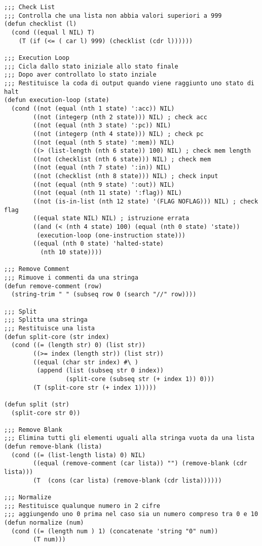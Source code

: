 \documentclass[a4paper,12pt, oneside]{book}
\begin{document}
\begin{verbatim}
;;; Check List
;;; Controlla che una lista non abbia valori superiori a 999
(defun checklist (l)
  (cond ((equal l NIL) T)
    (T (if (<= ( car l) 999) (checklist (cdr l))))))

;;; Execution Loop
;;; Cicla dallo stato iniziale allo stato finale 
;;; Dopo aver controllato lo stato inziale
;;; Restituisce la coda di output quando viene raggiunto uno stato di halt
(defun execution-loop (state)
  (cond ((not (equal (nth 1 state) ':acc)) NIL)
        ((not (integerp (nth 2 state))) NIL) ; check acc
        ((not (equal (nth 3 state) ':pc)) NIL)
        ((not (integerp (nth 4 state))) NIL) ; check pc
        ((not (equal (nth 5 state) ':mem)) NIL)
        ((> (list-length (nth 6 state)) 100) NIL) ; check mem length
        ((not (checklist (nth 6 state))) NIL) ; check mem
        ((not (equal (nth 7 state) ':in)) NIL)
        ((not (checklist (nth 8 state))) NIL) ; check input
        ((not (equal (nth 9 state) ':out)) NIL)
        ((not (equal (nth 11 state) ':flag)) NIL)
        ((not (is-in-list (nth 12 state) '(FLAG NOFLAG))) NIL) ; check flag
        ((equal state NIL) NIL) ; istruzione errata
        ((and (< (nth 4 state) 100) (equal (nth 0 state) 'state))
         (execution-loop (one-instruction state)))
        ((equal (nth 0 state) 'halted-state) 
          (nth 10 state))))

;;; Remove Comment
;;; Rimuove i commenti da una stringa 
(defun remove-comment (row)
  (string-trim " " (subseq row 0 (search "//" row))))

;;; Split
;;; Splitta una stringa
;;; Restituisce una lista 
(defun split-core (str index)
  (cond ((= (length str) 0) (list str))
        ((>= index (length str)) (list str))
        ((equal (char str index) #\ )
         (append (list (subseq str 0 index)) 
                 (split-core (subseq str (+ index 1)) 0)))
        (T (split-core str (+ index 1)))))

(defun split (str)
  (split-core str 0))

;;; Remove Blank
;;; Elimina tutti gli elementi uguali alla stringa vuota da una lista
(defun remove-blank (lista)
  (cond ((= (list-length lista) 0) NIL)
        ((equal (remove-comment (car lista)) "") (remove-blank (cdr lista)))
        (T  (cons (car lista) (remove-blank (cdr lista))))))

;;; Normalize
;;; Restituisce qualunque numero in 2 cifre
;;; aggiungendo uno 0 prima nel caso sia un numero compreso tra 0 e 10
(defun normalize (num)
  (cond ((= (length num ) 1) (concatenate 'string "0" num))
        (T num)))


\end{verbatim}
\end{document}
